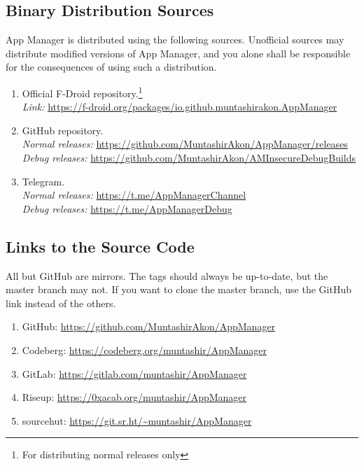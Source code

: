 \subsection{Binary Distribution Sources}\label{subsec:binary-distribution-sources} %
App Manager is distributed using the following sources. Unofficial sources may distribute modified versions of App
Manager, and you alone shall be responsible for the consequences of using such a distribution.
\begin{enumerate}
    \item Official F-Droid repository.\footnote{For distributing normal releases only}\\
    \textit{Link:} \url{https://f-droid.org/packages/io.github.muntashirakon.AppManager}
    \item GitHub repository.\\
    \textit{Normal releases:} \url{https://github.com/MuntashirAkon/AppManager/releases}\\
    \textit{Debug releases:} \url{https://github.com/MuntashirAkon/AMInsecureDebugBuilds}
    \item Telegram.\\
    \textit{Normal releases:} \url{https://t.me/AppManagerChannel}\\
    \textit{Debug releases:} \url{https://t.me/AppManagerDebug}
\end{enumerate}

\subsection{Links to the Source Code}\label{subsec:links-to-source-code} %
All but GitHub are mirrors. The tags should always be up-to-date, but the master branch may not.
If you want to clone the master branch, use the GitHub link instead of the others.
\begin{enumerate}
    \item GitHub: \url{https://github.com/MuntashirAkon/AppManager}
    \item Codeberg: \url{https://codeberg.org/muntashir/AppManager}
    \item GitLab: \url{https://gitlab.com/muntashir/AppManager}
    \item Riseup: \url{https://0xacab.org/muntashir/AppManager}
    \item sourcehut: \url{https://git.sr.ht/~muntashir/AppManager}
\end{enumerate}

